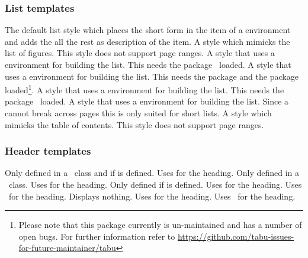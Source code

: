 \documentclass{acro-manual}
\begin{document}
\subsubsection{List templates}
\begin{templates}
    The default list style which places the short form in the item of a
     environment and adds the all the rest as description of
    the item.
    A style which mimicks the list of figures.  This style does not support
    page ranges.
    A style that uses a  environment for building the list.
    This needs the  package~\cite{pkg:longtable} loaded.
    A style that uses a  environment for building the
    list. This needs the  package and the 
    package~\cite{pkg:tabu} loaded\footnote{Please note that this package
      currently is un-maintained and has a number of open bugs. For further
      information refer to
      \url{https://github.com/tabu-issues-for-future-maintainer/tabu}}.
    A style that uses a  environment for
    building the list.  This needs the 
    package~\cite{pkg:supertabular} loaded.
    A style that uses a  environment for building the list.
    Since a  cannot break across pages this is only suited for
    short lists.
    A style which mimicks the table of contents.  This style does not support
    page ranges.
\end{templates}

\subsubsection{Header templates}
\begin{templates}
    Only defined in a \KOMAScript\ class and if  is defined. Uses
     for the heading.
    Only defined in a \KOMAScript\ class. Uses  for the heading.
    Only defined if  is defined. Uses  for the heading.
    Uses \sarg\ for the heading.
    Displays nothing.
    Uses  for the heading.
    Uses \sarg\ for the heading.
\end{templates}
\end{document}
